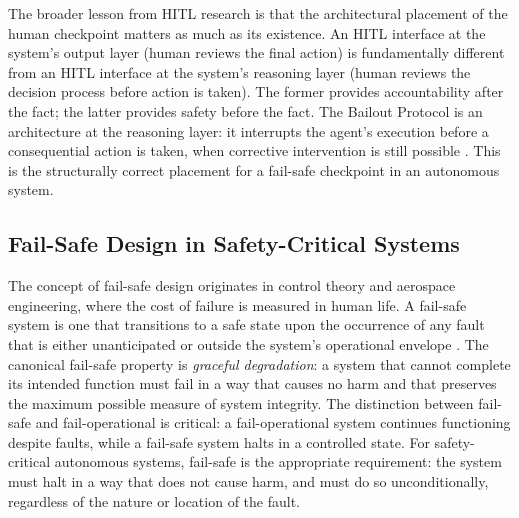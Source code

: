 The broader lesson from HITL research is that the architectural placement of the human checkpoint matters as much as its existence. An HITL interface at the system's output layer (human reviews the final action) is fundamentally different from an HITL interface at the system's reasoning layer (human reviews the decision process before action is taken). The former provides accountability after the fact; the latter provides safety before the fact. The Bailout Protocol is an architecture at the reasoning layer: it interrupts the agent's execution before a consequential action is taken, when corrective intervention is still possible \cite{bailoutprotocol2026}. This is the structurally correct placement for a fail-safe checkpoint in an autonomous system.


\subsection{Fail-Safe Design in Safety-Critical Systems}

The concept of fail-safe design originates in control theory and aerospace engineering, where the cost of failure is measured in human life. A fail-safe system is one that transitions to a safe state upon the occurrence of any fault that is either unanticipated or outside the system's operational envelope \cite{leveson2011}. The canonical fail-safe property is \emph{graceful degradation}: a system that cannot complete its intended function must fail in a way that causes no harm and that preserves the maximum possible measure of system integrity. The distinction between fail-safe and fail-operational is critical: a fail-operational system continues functioning despite faults, while a fail-safe system halts in a controlled state. For safety-critical autonomous systems, fail-safe is the appropriate requirement: the system must halt in a way that does not cause harm, and must do so unconditionally, regardless of the nature or location of the fault.


